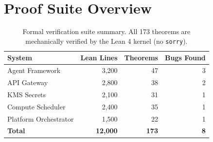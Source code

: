 \section{Proof Suite Overview}

\label{sec:overview}

\begin{table}[H]
\centering
\small
\begin{tabular}{lrrr}
\toprule
\textbf{System} & \textbf{Lean Lines} & \textbf{Theorems} & \textbf{Bugs Found} \\
\midrule
Agent Framework & 3,200 & 47 & 3 \\
API Gateway & 2,800 & 38 & 2 \\
KMS Secrets & 2,100 & 31 & 1 \\
Compute Scheduler & 2,400 & 35 & 1 \\
Platform Orchestrator & 1,500 & 22 & 1 \\
\midrule
\textbf{Total} & \textbf{12,000} & \textbf{173} & \textbf{8} \\
\bottomrule
\end{tabular}
\caption{Formal verification suite summary. All 173 theorems are
mechanically verified by the Lean 4 kernel (no \texttt{sorry}).}
\label{tab:overview}
\end{table}

